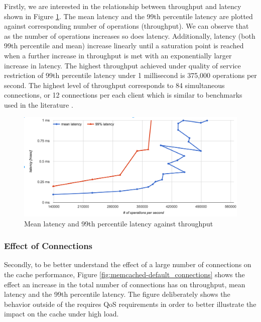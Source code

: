 Firstly, we are interested in the relationship between throughput and latency shown in Figure \ref{fig:memcached-default-latency-vs-ops}. The mean latency and the 99th percentile latency are plotted against corresponding number of operations (throughput). We can observe that as the number of operations increases so does latency. Additionally, latency (both 99th percentile and mean) increase linearly until a saturation point is reached when a further increase in throughput is met with an exponentially larger increase in latency. The highest throughput achieved under quality of service restriction of 99th percentile latency under 1 millisecond is 375,000 operations per second. The highest level of throughput corresponds to 84 simultaneous connections, or 12 connections per each client which is similar to benchmarks used in the literature \cite{lim2013thin}.

\begin{figure}[h]
    \includegraphics[width=\textwidth]{./res/5_default_latency_vs_ops.png}
    \caption{Mean latency and 99th percentile latency against throughput}
    \label{fig:memcached-default-latency-vs-ops}
\end{figure}


\subsubsection{Effect of Connections}
Secondly, to be better understand the effect of a large number of connections on the cache performance, Figure \ref{fig:memcached-default_connections} shows the effect an increase in the total number of connections has on throughput, mean latency and the 99th percentile latency. The figure deliberately shows the behavior outside of the requires QoS requirements in order to better illustrate the impact on the cache under high load.

